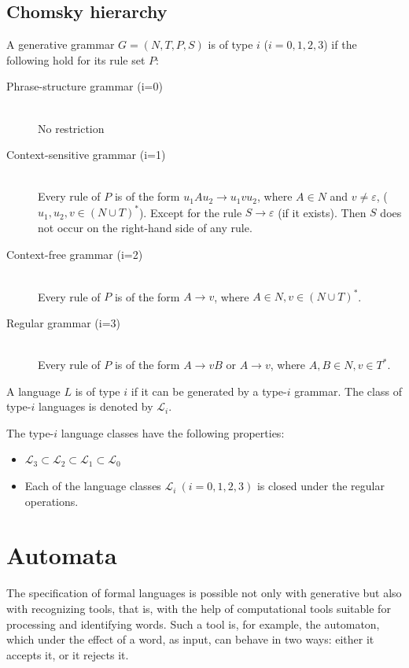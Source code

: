 \documentclass[margin=0px]{article}
\begin{document}
\subsection{Chomsky hierarchy}
A generative grammar $G = (N,T,P,S)$ is of type $i$ ($i=0,1,2,3$) if the following hold for its rule set $P$:
\begin{description}
    \item[Phrase-structure grammar (i=0)] \hfill \\
        No restriction
    \item[Context-sensitive grammar (i=1)] \hfill \\
        Every rule of $P$ is of the form $u_1Au_2 \rightarrow u_1vu_2$, where $A\in N$ and $ v \neq \varepsilon $, ($u_1,u_2, v \in (N \cup T)^*$).
        Except for the rule $S \rightarrow \varepsilon$ (if it exists). Then $S$ does not occur on the right-hand side of any rule.
    \item[Context-free grammar (i=2)] \hfill \\
        Every rule of $P$ is of the form $A \rightarrow v$, where $A\in N, v \in (N \cup T)^*$.
    \item[Regular grammar (i=3)] \hfill \\
        Every rule of $P$ is of the form $A \rightarrow vB$ or $A \rightarrow v$, where $A,B\in N, v \in T^*$.
\end{description}

\noindent
A language $L$ is of type $i$ if it can be generated by a type-$i$ grammar. The class of type-$i$ languages is denoted by $\mathcal{L}_i$.

\noindent
The type-$i$ language classes have the following properties:
\begin{itemize}
    \item $ \mathcal{L}_3 \subset \mathcal{L}_2 \subset \mathcal{L}_1 \subset \mathcal{L}_0 $
    \item Each of the language classes $\mathcal{L}_i \ (i=0,1,2,3)$ is closed under the regular operations.
\end{itemize}
\section{Automata}
The specification of formal languages is possible not only with generative but also with recognizing tools, that is, with the help of computational tools suitable for processing and identifying words.
Such a tool is, for example, the automaton, which under the effect of a word, as input, can behave in two ways: either it accepts it, or it rejects it.
\end{document}
